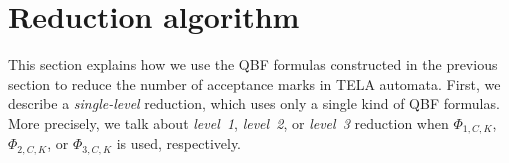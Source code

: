 \documentclass[runningheads]{llncs}
\newcommand{\rem}{\mathit{nm}}
\def\false{\mathit{false}}
\def\true{\mathit{true}}
\newcommand{\mA}{\mathcal{A}}
\begin{document}

\section{Reduction algorithm}\label{sec:algo}

This section explains how we use the QBF formulas constructed in the
previous section to reduce the number of acceptance marks in TELA
automata. First, we describe a \emph{single-level} reduction, which
uses only a single kind of QBF formulas. More precisely, we talk about
\emph{level~1}, \emph{level~2}, or \emph{level~3} reduction when
$\Phi_{1,C,K}$, $\Phi_{2,C,K}$, or
$\Phi_{3,C,K}$ is used, respectively.

\end{document}
